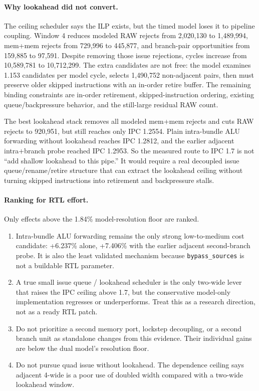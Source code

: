 \documentclass[10pt]{article}
\begin{document}
\paragraph{Why lookahead did not convert.}
The ceiling scheduler says the ILP exists, but the timed model loses it to
pipeline coupling. Window 4 reduces modeled RAW rejects from 2,020,130 to
1,489,994, mem+mem rejects from 729,996 to 445,877, and branch-pair
opportunities from 159,885 to 97,591. Despite removing those issue rejections,
cycles increase from 10,589,781 to 10,712,299. The extra candidates are not
free: the model examines 1.153 candidates per model cycle, selects 1,490,752
non-adjacent pairs, then must preserve older skipped instructions with an
in-order retire buffer. The remaining binding constraints are in-order
retirement, skipped-instruction ordering, existing queue/backpressure behavior,
and the still-large residual RAW count.

The best lookahead stack removes all modeled mem+mem rejects and cuts RAW
rejects to 920,951, but still reaches only IPC 1.2554. Plain intra-bundle ALU
forwarding without lookahead reaches IPC 1.2812, and the earlier adjacent
intra+branch probe reached IPC 1.2953. So the measured route to IPC 1.7 is not
``add shallow lookahead to this pipe.'' It would require a real decoupled issue
queue/rename/retire structure that can extract the lookahead ceiling without
turning skipped instructions into retirement and backpressure stalls.

\paragraph{Ranking for RTL effort.}
Only effects above the 1.84\% model-resolution floor are ranked.

\begin{enumerate}
\item Intra-bundle ALU forwarding remains the only strong low-to-medium cost
candidate: +6.237\% alone, +7.406\% with the earlier adjacent second-branch
probe. It is also the least validated mechanism because \texttt{bypass\_sources}
is not a buildable RTL parameter.
\item A true small issue queue / lookahead scheduler is the only two-wide lever
that raises the IPC ceiling above 1.7, but the conservative model-only
implementation regresses or underperforms. Treat this as a research direction,
not as a ready RTL patch.
\item Do not prioritize a second memory port, lockstep decoupling, or a second
branch unit as standalone changes from this evidence. Their individual gains
are below the dual model's resolution floor.
\item Do not pursue quad issue without lookahead. The dependence ceiling says
adjacent 4-wide is a poor use of doubled width compared with a two-wide
lookahead window.
\end{enumerate}
\end{document}
